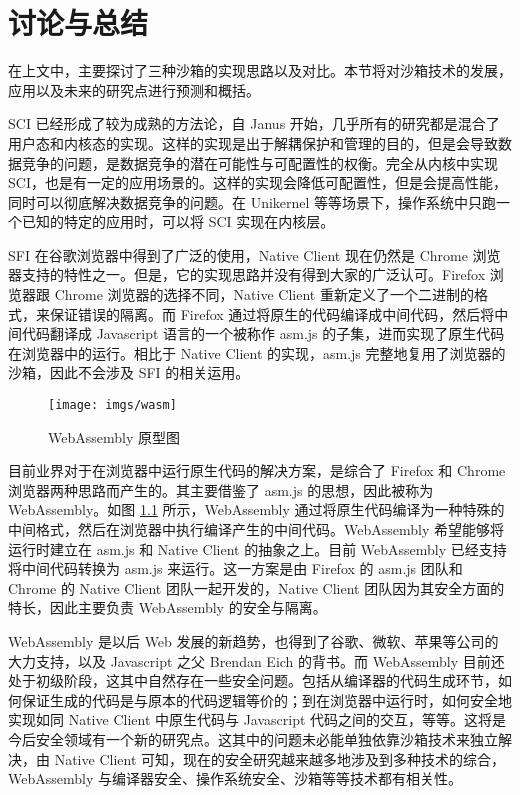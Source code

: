 
\chapter{讨论与总结}
\label{s:tucao}

在上文中，主要探讨了三种沙箱的实现思路以及对比。本节将对沙箱技术的发展，应用以及未来的研究点进行预测和概括。

SCI 已经形成了较为成熟的方法论，自 Janus 开始，几乎所有的研究都是混合了用户态和内核态的实现。这样的实现是出于解耦保护和管理的目的，但是会导致数据竞争的问题，是数据竞争的潜在可能性与可配置性的权衡。完全从内核中实现 SCI，也是有一定的应用场景的。这样的实现会降低可配置性，但是会提高性能，同时可以彻底解决数据竞争的问题。在 Unikernel 等等场景下，操作系统中只跑一个已知的特定的应用时，可以将 SCI 实现在内核层。

SFI 在谷歌浏览器中得到了广泛的使用，Native Client 现在仍然是 Chrome 浏览器支持的特性之一。但是，它的实现思路并没有得到大家的广泛认可。Firefox 浏览器跟 Chrome 浏览器的选择不同，Native Client 重新定义了一个二进制的格式，来保证错误的隔离。而 Firefox 通过将原生的代码编译成中间代码，然后将中间代码翻译成 Javascript 语言的一个被称作 asm.js 的子集，进而实现了原生代码在浏览器中的运行。相比于 Native Client 的实现，asm.js 完整地复用了浏览器的沙箱，因此不会涉及 SFI 的相关运用。

\begin{figure}[!htp]
  \centering
  \texttt{[image: imgs/wasm]}
  \caption{WebAssembly 原型图}
  \label{fig:wasm}
\end{figure}

目前业界对于在浏览器中运行原生代码的解决方案，是综合了 Firefox 和 Chrome 浏览器两种思路而产生的。其主要借鉴了 asm.js 的思想，因此被称为 WebAssembly。如图 \ref{fig:wasm} 所示，WebAssembly 通过将原生代码编译为一种特殊的中间格式，然后在浏览器中执行编译产生的中间代码。WebAssembly 希望能够将运行时建立在 asm.js 和 Native Client 的抽象之上。目前 WebAssembly 已经支持将中间代码转换为 asm.js 来运行。这一方案是由 Firefox 的 asm.js 团队和 Chrome 的 Native Client 团队一起开发的，Native Client 团队因为其安全方面的特长，因此主要负责 WebAssembly 的安全与隔离。

WebAssembly 是以后 Web 发展的新趋势，也得到了谷歌、微软、苹果等公司的大力支持，以及 Javascript 之父 Brendan Eich 的背书。而 WebAssembly 目前还处于初级阶段，这其中自然存在一些安全问题。包括从编译器的代码生成环节，如何保证生成的代码是与原本的代码逻辑等价的；到在浏览器中运行时，如何安全地实现如同 Native Client 中原生代码与 Javascript 代码之间的交互，等等。这将是今后安全领域有一个新的研究点。这其中的问题未必能单独依靠沙箱技术来独立解决，由 Native Client 可知，现在的安全研究越来越多地涉及到多种技术的综合，WebAssembly 与编译器安全、操作系统安全、沙箱等等技术都有相关性。

